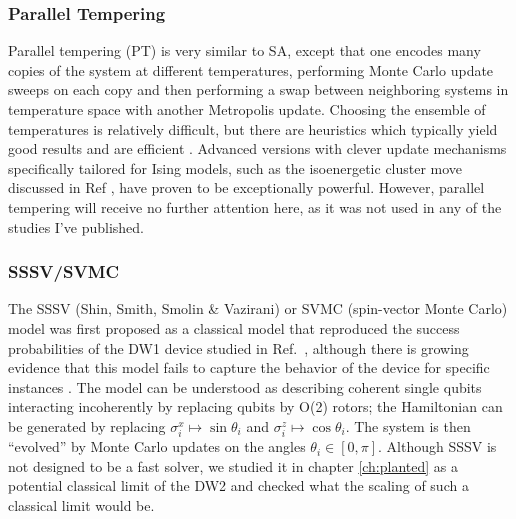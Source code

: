 \subsubsection{Parallel Tempering}
Parallel tempering (PT) \cite{Geyer:91,Earl:2005pd,katzgraber:06a} is very similar to SA, except that one encodes many copies of the system at different temperatures, performing Monte Carlo update sweeps on each copy and then performing a swap between neighboring systems in temperature space with another Metropolis update. Choosing the ensemble of temperatures is relatively difficult, but there are heuristics which typically yield good results and are efficient \cite{katzgraber:06a}. Advanced versions with clever update mechanisms specifically tailored for Ising models, such as the isoenergetic cluster move discussed in Ref \cite{PhysRevLett.115.077201}, have proven to be exceptionally powerful. However, parallel tempering will receive no further attention here, as it was not used in any of the studies I've published.

\subsubsection{SSSV/SVMC}
The SSSV (Shin, Smith, Smolin \& Vazirani) or SVMC (spin-vector Monte Carlo) model was first proposed \cite{SSSV} as a classical model that reproduced the success probabilities of the DW1 device studied in Ref.~\cite{q108}, although there is growing evidence that this model fails to capture the behavior of the device for specific instances \cite{q-sig2,Albash:2014if,Boixo:2014yu}.  The model can be understood as describing coherent single qubits interacting incoherently by replacing qubits by O(2) rotors; the Hamiltonian can be generated by replacing $\sigma_i^x \mapsto \sin \theta_i$ and $\sigma^z_i \mapsto \cos \theta_i$.  The system is then ``evolved'' by Monte Carlo updates on the angles $\theta_i \in [0, \pi]$.  Although SSSV is not designed to be a fast solver, we studied it in chapter \ref{ch:planted} as a potential classical limit of the DW2 and checked what the scaling of such a classical limit would be.

